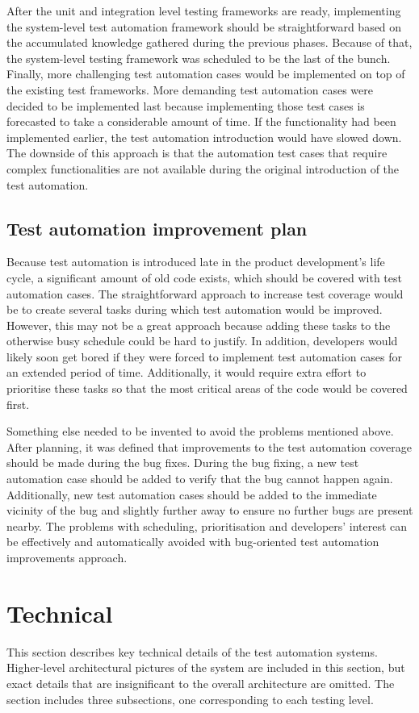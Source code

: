 After the unit and integration level testing frameworks are ready, implementing the system-level test automation framework should be straightforward based on the accumulated knowledge gathered during the previous phases. Because of that, the system-level testing framework was scheduled to be the last of the bunch. Finally, more challenging test automation cases would be implemented on top of the existing test frameworks. More demanding test automation cases were decided to be implemented last because implementing those test cases is forecasted to take a considerable amount of time. If the functionality had been implemented earlier, the test automation introduction would have slowed down. The downside of this approach is that the automation test cases that require complex functionalities are not available during the original introduction of the test automation.

\subsection{Test automation improvement plan}
Because test automation is introduced late in the product development's life cycle, a significant amount of old code exists, which should be covered with test automation cases. The straightforward approach to increase test coverage would be to create several tasks during which test automation would be improved. However, this may not be a great approach because adding these tasks to the otherwise busy schedule could be hard to justify. In addition, developers would likely soon get bored if they were forced to implement test automation cases for an extended period of time. Additionally, it would require extra effort to prioritise these tasks so that the most critical areas of the code would be covered first.

Something else needed to be invented to avoid the problems mentioned above. After planning, it was defined that improvements to the test automation coverage should be made during the bug fixes. During the bug fixing, a new test automation case should be added to verify that the bug cannot happen again. Additionally, new test automation cases should be added to the immediate vicinity of the bug and slightly further away to ensure no further bugs are present nearby. The problems with scheduling, prioritisation and developers' interest can be effectively and automatically avoided with bug-oriented test automation improvements approach.

\section{Technical}\label{section:technical}
This section describes key technical details of the test automation systems. Higher-level architectural pictures of the system are included in this section, but exact details that are insignificant to the overall architecture are omitted. The section includes three subsections, one corresponding to each testing level.

